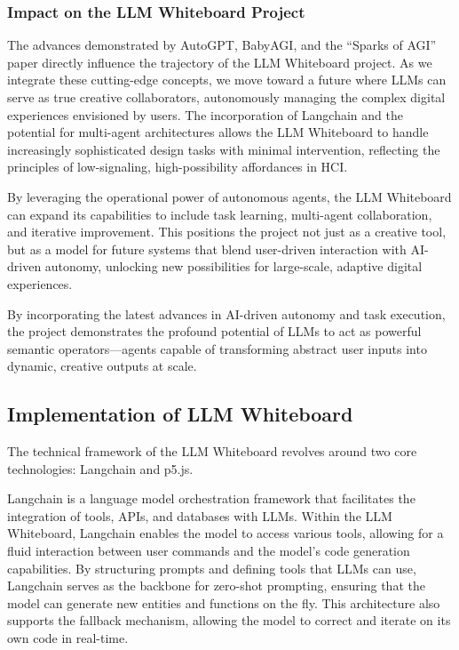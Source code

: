 \subsubsection{Impact on the LLM Whiteboard Project}
The advances demonstrated by AutoGPT, BabyAGI, and the “Sparks of AGI” paper directly influence the trajectory of the LLM Whiteboard project.
As we integrate these cutting-edge concepts, we move toward a future where LLMs can serve as true creative collaborators, autonomously managing the complex digital experiences envisioned by users.
The incorporation of Langchain and the potential for multi-agent architectures allows the LLM Whiteboard to handle increasingly sophisticated design tasks with minimal intervention, reflecting the principles of low-signaling, high-possibility affordances in HCI.

By leveraging the operational power of autonomous agents, the LLM Whiteboard can expand its capabilities to include task learning, multi-agent collaboration, and iterative improvement.
This positions the project not just as a creative tool, but as a model for future systems that blend user-driven interaction with AI-driven autonomy, unlocking new possibilities for large-scale, adaptive digital experiences.

By incorporating the latest advances in AI-driven autonomy and task execution, the project demonstrates the profound potential of LLMs to act as powerful semantic operators—agents capable of transforming abstract user inputs into dynamic, creative outputs at scale.

\subsection{ Implementation of LLM Whiteboard}

The technical framework of the LLM Whiteboard revolves around two core technologies: Langchain and p5.js.

Langchain is a language model orchestration framework that facilitates the integration of tools, APIs, and databases with LLMs.
Within the LLM Whiteboard, Langchain enables the model to access various tools, allowing for a fluid interaction between user commands and the model's code generation capabilities.
By structuring prompts and defining tools that LLMs can use, Langchain serves as the backbone for zero-shot prompting, ensuring that the model can generate new entities and functions on the fly.
This architecture also supports the fallback mechanism, allowing the model to correct and iterate on its own code in real-time.

